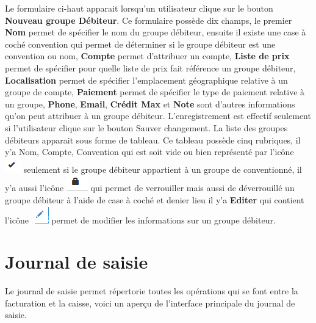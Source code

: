\documentclass[12pt,a4paper]{report}
\begin{document}
Le formulaire ci-haut apparait lorsqu'un utilisateur clique sur le bouton \textbf{Nouveau groupe Débiteur}. Ce formulaire possède dix champs, le premier \textbf{Nom} permet de spécifier le nom du groupe débiteur, ensuite il existe une case à coché convention qui permet de déterminer si le groupe débiteur est une convention ou nom, \textbf{Compte }permet d'attribuer un compte, \textbf{Liste de prix}  permet de spécifier pour quelle liste de prix fait référence un groupe débiteur, \textbf{Localisation} permet de spécifier l'emplacement géographique relative à un groupe de compte, \textbf{Paiement} permet de spécifier le type de paiement relative à un groupe,\textbf{ Phone}, \textbf{Email}, \textbf{Crédit Max }et \textbf{Note} sont d'autres informations qu'on peut attribuer à un groupe débiteur.
L'enregistrement est effectif seulement si l'utilisateur clique sur le bouton Sauver changement.
La liste des groupes débiteurs apparait sous forme de tableau. Ce tableau possède cinq rubriques, il y'a Nom, Compte, Convention qui est soit vide ou bien représenté par l'icône \includegraphics[scale=0.7]{pic/IconOk.png}  seulement si le groupe débiteur appartient à un groupe de conventionné,  il y'a aussi l'icône \includegraphics[scale=0.7]{pic/Locked.png}  qui permet de verrouiller mais aussi de déverrouillé un groupe débiteur à l'aide de case à coché et denier lieu il y'a \textbf{Editer} qui contient l'icône \includegraphics[scale=0.7]{pic/EditUser.png}   permet de modifier les informations sur un groupe débiteur.

\newpage
\section{Journal de saisie}
Le journal de saisie  permet répertorie toutes les opérations qui se font entre la facturation et la caisse, voici un aperçu de l'interface principale du journal de saisie.
\end{document}
